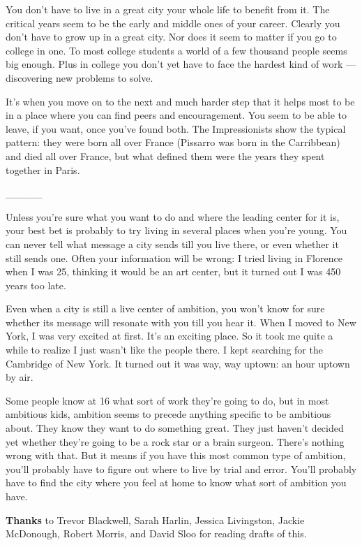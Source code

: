 \documentclass[12pt]{book}
\begin{document}
You don't have to live in a great city your whole life to benefit from
it. The critical years seem to be the early and middle ones of your
career. Clearly you don't have to grow up in a great city. Nor does it
seem to matter if you go to college in one. To most college students a
world of a few thousand people seems big enough. Plus in college you
don't yet have to face the hardest kind of work --- discovering new
problems to solve.

It's when you move on to the next and much harder step that it helps
most to be in a place where you can find peers and encouragement. You
seem to be able to leave, if you want, once you've found both. The
Impressionists show the typical pattern: they were born all over France
(Pissarro was born in the Carribbean) and died all over France, but what
defined them were the years they spent together in Paris.

\_\_\_\_\_

Unless you're sure what you want to do and where the leading center for
it is, your best bet is probably to try living in several places when
you're young. You can never tell what message a city sends till you live
there, or even whether it still sends one. Often your information will
be wrong: I tried living in Florence when I was 25, thinking it would be
an art center, but it turned out I was 450 years too late.

Even when a city is still a live center of ambition, you won't know for
sure whether its message will resonate with you till you hear it. When I
moved to New York, I was very excited at first. It's an exciting place.
So it took me quite a while to realize I just wasn't like the people
there. I kept searching for the Cambridge of New York. It turned out it
was way, way uptown: an hour uptown by air.

Some people know at 16 what sort of work they're going to do, but in
most ambitious kids, ambition seems to precede anything specific to be
ambitious about. They know they want to do something great. They just
haven't decided yet whether they're going to be a rock star or a brain
surgeon. There's nothing wrong with that. But it means if you have this
most common type of ambition, you'll probably have to figure out where
to live by trial and error. You'll probably have to find the city where
you feel at home to know what sort of ambition you have.


\textbf{Thanks} to Trevor Blackwell, Sarah Harlin, Jessica Livingston,
Jackie McDonough, Robert Morris, and David Sloo for reading drafts of
this.
\end{document}
